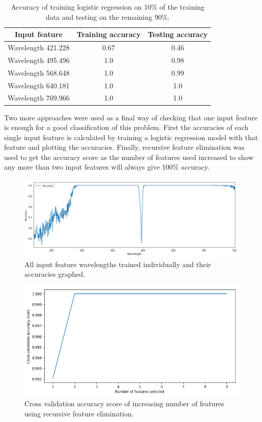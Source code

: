 \documentclass{article}
\begin{document}
\begin{table}[H]
\centering
\begin{tabular}{| c | c | c |}
\hline
\textbf{Input feature} & \textbf{Training accuracy} & \textbf{Testing accuracy}\\
\hline
Wavelength 421.228 & 0.67 & 0.46\\
\hline
Wavelength 495.496 & 1.0 & 0.98\\
\hline
Wavelength 568.648 & 1.0 & 0.99\\
\hline
Wavelength 640.181 & 1.0 & 1.0\\
\hline
Wavelength 709.966 & 1.0 & 1.0\\
\hline
\end{tabular}
\caption{Accuracy of training logistic regression on 10\% of the training data and testing on the remaining 90\%.}
\end{table}
Two more approaches were used as a final way of checking that one input feature is enough for a good classification of this problem. First the accuracies of each single input feature is calculated by training a logistic regression model with that feature and plotting the accuracies. Finally, recursive feature elimination was used to get the accuracy score as the number of features used increased to show any more than two input features will always give 100\% accuracy. 
\begin{figure}[H]
\centering
\includegraphics[width=1\textwidth]{imgs/binary-accuracy.png}
\caption{All input feature wavelengths trained individually and their accuracies graphed.}
\label{fig:binary-accuracy}
\end{figure}
%
\begin{figure}[H]
\centering
\includegraphics[width=1\textwidth, keepaspectratio]{imgs/binary-numfeatures.png}
\caption{Cross validation accuracy score of increasing number of features using recursive feature elimination.}
\label{fig:binary-accuracyrfecv}
\end{figure}
\end{document}
